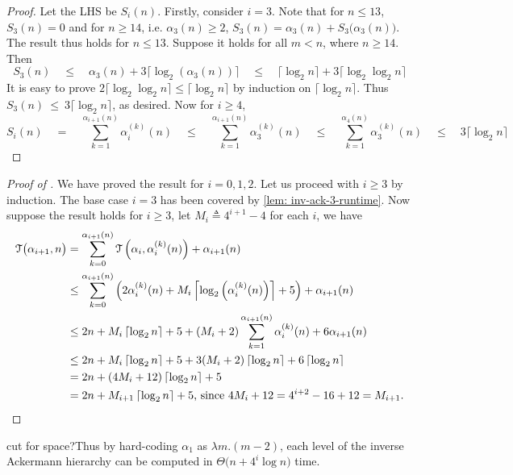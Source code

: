 \begin{proof}
	Let the LHS be $S_i(n)$. Firstly, consider $i = 3$. Note that for $n\le 13$, $S_3(n) = 0$ and for $n\ge 14$, i.e. $\alpha_3(n)\ge 2$, $S_3(n) = \alpha_3(n) + S_3\big(\alpha_3(n)\big)$. The result thus holds for $n\le 13$. Suppose it holds for all $m < n$, where $n\ge 14$. Then
	\begin{equation*}
	S_3(n) \quad \le \quad \alpha_3(n) + 3\big\lceil \log_2(\alpha_3(n)) \big\rceil \quad \le \quad \big\lceil \log_2n \big\rceil + 3\big\lceil \log_2\log_2n \big\rceil
	\end{equation*}
	It is easy to prove $2\big\lceil \log_2\log_2n \big\rceil \le \big\lceil \log_2n \big\rceil$ by induction on $\big\lceil \log_2n \big\rceil$. Thus $S_3(n)~\le~3\big\lceil \log_2n \big\rceil$, as desired. Now for $i \ge 4$,
	\begin{equation*}
	S_i(n) \quad = \quad \sum_{k=1}^{\alpha_{i+1}(n)} \alpha_i^{(k)}(n) \quad \le \quad 
	\sum_{k=1}^{\alpha_{i+1}(n)} \alpha_3^{(k)}(n) \quad \le \quad 
	\sum_{k=1}^{\alpha_{4}(n)} \alpha_3^{(k)}(n) \quad \le \quad 
	3\big\lceil \log_2n \big\rceil
	\end{equation*}
\end{proof}
\begin{proof}[Proof of ]
	We have proved the result for $i = 0, 1, 2$. Let us proceed with $i\ge 3$ by induction. The base case $i = 3$ has been covered by \cref{lem: inv-ack-3-runtime}. Now suppose the result holds for $i\ge 3$, let $M_i \triangleq 4^{i+1}-4$ for each $i$, we have
	\begin{equation*}
	\begin{aligned}
	\mathcal{T}\big(\alpha_{i+1}, n\big) & = \sum_{k=0}^{\alpha_{i+1}(n)} \mathcal{T}\left(\alpha_i, \alpha_i^{(k)}(n)\right) + \alpha_{i+1}(n) \\
	& \le \sum_{k=0}^{\alpha_{i+1}(n)}\left(2\alpha_i^{(k)}(n) + M_i\left\lceil\log_2\left(\alpha_i^{(k)}(n)\right)\right\rceil + 5 \right) + \alpha_{i+1}(n) \\
	& \le 2n + M_i\left\lceil\log_2n\right\rceil + 5 + (M_i+2)\sum_{k=1}^{\alpha_{i+1}(n)}\alpha_i^{(k)}(n) + 6\alpha_{i+1}(n) \\
	& \le 2n + M_i\left\lceil\log_2n\right\rceil + 5 +
	3(M_i + 2)\left\lceil\log_2n\right\rceil + 6\left\lceil\log_2n\right\rceil \\
	& = 2n + (4M_i + 12)\left\lceil\log_2n\right\rceil + 5 \\
	& = 2n + M_{i+1}\left\lceil\log_2n\right\rceil + 5\text{, since $4M_i + 12 = 4^{i+2} - 16 + 12 = M_{i+1}$}.
	\end{aligned}
	\end{equation*} 
\end{proof}
{\color{red}cut for space?}Thus by hard-coding $\alpha_1$ as $\lambda m.(m-2)$, each level of the inverse Ackermann hierarchy can be computed in $\Theta\big(n + 4^i\log n\big)$ time.

